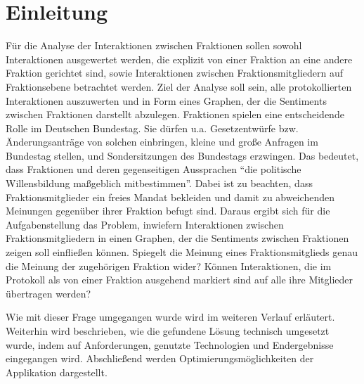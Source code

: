 \section{Einleitung}\label{sec:06_01_einleitung}
Für die Analyse der Interaktionen zwischen Fraktionen sollen sowohl Interaktionen ausgewertet werden, die explizit von einer Fraktion an eine andere Fraktion gerichtet sind, sowie Interaktionen zwischen Fraktionsmitgliedern auf Fraktionsebene betrachtet werden. Ziel der Analyse soll sein, alle protokollierten Interaktionen auszuwerten und in Form eines Graphen, der die Sentiments zwischen Fraktionen darstellt abzulegen.
Fraktionen spielen eine entscheidende Rolle im Deutschen Bundestag. Sie dürfen u.a. Gesetzentwürfe bzw. Änderungsanträge von solchen einbringen, kleine und große Anfragen im Bundestag stellen, und Sondersitzungen des Bundestags erzwingen. Das bedeutet, dass Fraktionen und deren gegenseitigen Aussprachen ``die politische Willensbildung maßgeblich mitbestimmen''.
Dabei ist zu beachten, dass Fraktionsmitglieder ein freies Mandat bekleiden und damit zu abweichenden Meinungen gegenüber ihrer Fraktion befugt sind. Daraus ergibt sich für die Aufgabenstellung das Problem, inwiefern Interaktionen zwischen Fraktionsmitgliedern in einen Graphen, der die Sentiments zwischen Fraktionen zeigen soll einfließen können. Spiegelt die Meinung eines Fraktionsmitglieds genau die Meinung der zugehörigen Fraktion wider? Können Interaktionen, die im Protokoll als von einer Fraktion ausgehend markiert sind auf alle ihre Mitglieder übertragen werden?

Wie mit dieser Frage umgegangen wurde wird im weiteren Verlauf erläutert. Weiterhin wird beschrieben, wie die gefundene Lösung technisch umgesetzt wurde, indem auf Anforderungen, genutzte Technologien und Endergebnisse eingegangen wird. Abschließend werden Optimierungsmöglichkeiten der Applikation dargestellt.